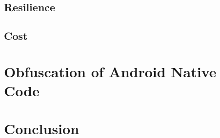\documentclass[
  digital, %
  notable,   %
  twoside, %
  nolof,     %
  nolot,     %
]{fithesis3}
\theoremstyle{definition}
\begin{document}
\section{Resilience}

\section{Cost}

\chapter{Obfuscation of Android Native Code}

\chapter{Conclusion}


\printbibliography[heading=bibintoc] %
\end{document}
